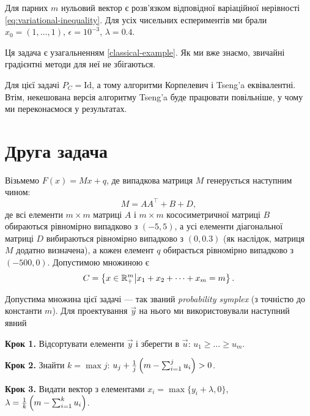 Для парних $m$ нульовий вектор є розв'язком відповідної варіаційної нерівності \eqref{eq:variational-inequality}. Для усіх чисельних еспериментів ми брали $x_0 = (1, \dots, 1)$, $\epsilon = 10^{-3}$, $\lambda = 0.4$. 

\begin{remark}
    Ця задача є узагальненням \ref{classical-example}. Як ми вже знаємо, звичайні градієнтні методи для неї не збігаються.
\end{remark}

\begin{remark}
    Для цієї задачі $P_C = \text{Id}$, а тому алгоритми Корпелевич і Tseng'a еквівалентні. Втім, некешована версія алгоритму Tseng'a буде працювати повільніше, у чому ми переконаємося у результатах.
\end{remark}

\section{Друга задача}

Візьмемо $F(x) = M x + q$, де випадкова матриця $M$ генерується наступним чином:
\begin{equation}
    M = A A^\intercal + B + D,
\end{equation}
де всі елементи $m \times m$ матриці $A$ і $m \times m$ кососиметричної матриці $B$ обираються рівномірно випадково з $(-5, 5)$, а усі елементи діагональної матриці $D$ вибираються рівномірно випадково з $(0, 0.3)$ (як наслідок, матриця $M$ додатно визначена), а кожен елемент $q$ обирається рівномірно випадково з $(-500, 0)$. Допустимою множиною є 
\begin{equation}
    C = \left\{ x \in \mathbb{R}_+^m \middle| x_1 + x_2 + \dots + x_m = m \right\}.
\end{equation}

Допустима множина цієї задачі --- так званий \emph{probability symplex} (з точністю до константи $m$). Для проектування $\vec y$ на нього ми використовували наступний явний
\begin{algorithm}\nothing

    \textbf{Крок 1.} Відсортувати елементи $\vec y$ і зберегти в $\vec u$: $u_1 \ge \dots \ge u_m$. \medskip
        
    \textbf{Крок 2.} Знайти $k = \max j$: $u_j + \frac{1}{j} \left( m - \operatorname*{\sum}_{i = 1}^j u_i \right) > 0$. \medskip
        
    \textbf{Крок 3.} Видати вектор з елементами $x_i = \max\{y_i + \lambda, 0\}$, $\lambda = \frac{1}{k} \left( m - \operatorname*{\sum}_{i = 1}^k u_i \right)$.
\end{algorithm}

